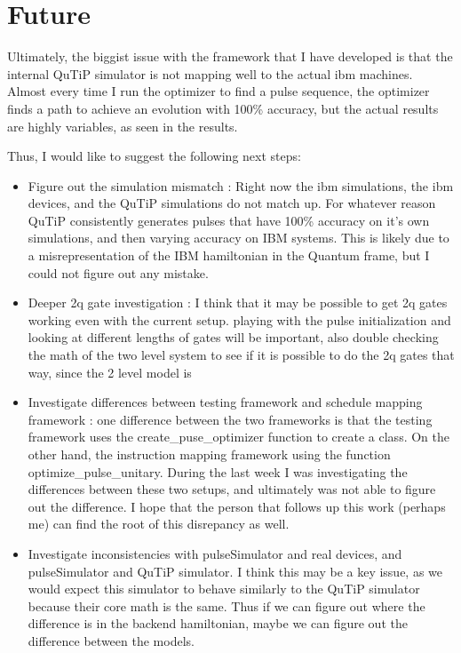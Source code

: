 \documentclass[12pt]{article}
\begin{document}
\section{Future}\label{future}

Ultimately, the biggist issue with the framework that I have developed is that
the internal QuTiP simulator is not mapping well to the actual ibm machines.
Almost every time I run the optimizer to find a pulse sequence, the optimizer
finds a path to achieve an evolution with 100\% accuracy, but the actual results
are highly variables, as seen in the results.


Thus, I would like to suggest the following next steps:
\begin{itemize}
    \item Figure out the simulation mismatch : Right now the ibm simulations,
    the ibm devices, and the QuTiP simulations do not match up. For whatever
    reason QuTiP consistently generates pulses that have 100\% accuracy on it's
    own simulations, and then varying accuracy on IBM systems. This is likely
    due to a misrepresentation of the IBM hamiltonian in the Quantum frame, but
    I could not figure out any mistake.
    \item Deeper 2q gate investigation : I think that it may be possible to get
    2q gates working even with the current setup. playing with the pulse
    initialization and looking at different lengths of gates will be important,
    also double checking the math of the two level system to see if it is
    possible to do the 2q gates that way, since the 2 level model is 
    \item Investigate differences between testing framework and schedule mapping
    framework : one difference between the two frameworks is that the testing
    framework uses the create\_puse\_optimizer function to create a class. On
    the other hand, the instruction mapping framework using the function
    optimize\_pulse\_unitary. During the last week I was investigating the
    differences between these two setups, and ultimately was not able to figure
    out the difference. I hope that the person that follows up this work
    (perhaps me) can find the root of this disrepancy as well.
    \item Investigate inconsistencies with pulseSimulator and real devices, and
    pulseSimulator and QuTiP simulator. I think this may be a key issue, as we
    would expect this simulator to behave similarly to the QuTiP simulator
    because their core math is the same. Thus if we can figure out where the
    difference is in the backend hamiltonian, maybe we can figure out the
    difference between the models.
\end{itemize}
\end{document}
